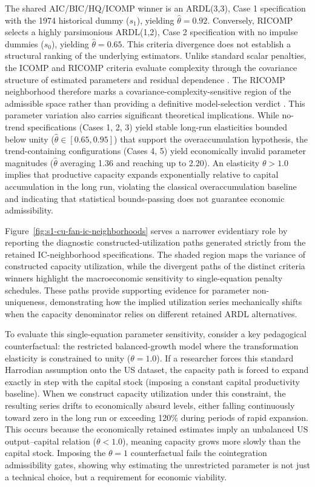 \documentclass[11pt]{article}
\begin{document}
The shared AIC/BIC/HQ/ICOMP winner is an ARDL(3,3), Case 1 specification with the 1974 historical dummy (\(s_1\)), yielding \(\hat{\theta}=0.92\). Conversely, RICOMP selects a highly parsimonious ARDL(1,2), Case 2 specification with no impulse dummies (\(s_0\)), yielding \(\hat{\theta}=0.65\). This criteria divergence does not establish a structural ranking of the underlying estimators. Unlike standard scalar penalties, the ICOMP and RICOMP criteria evaluate complexity through the covariance structure of estimated parameters and residual dependence \citep{Bozdogan1990,Bozdogan2000}. The RICOMP neighborhood therefore marks a covariance-complexity-sensitive region of the admissible space rather than providing a definitive model-selection verdict \citep{GuneyBozdoganArslan2021}. This parameter variation also carries significant theoretical implications. While no-trend specifications (Cases 1, 2, 3) yield stable long-run elasticities bounded below unity ($\hat{\theta} \in [0.65, 0.95]$) that support the overaccumulation hypothesis, the trend-containing configurations (Cases 4, 5) yield economically invalid parameter magnitudes ($\hat{\theta}$ averaging 1.36 and reaching up to 2.20). An elasticity $\theta > 1.0$ implies that productive capacity expands exponentially relative to capital accumulation in the long run, violating the classical overaccumulation baseline and indicating that statistical bounds-passing does not guarantee economic admissibility.

Figure~\ref{fig:s1-cu-fan-ic-neighborhoods} serves a narrower evidentiary role by reporting the diagnostic constructed-utilization paths generated strictly from the retained IC-neighborhood specifications. The shaded region maps the variance of constructed capacity utilization, while the divergent paths of the distinct criteria winners highlight the macroeconomic sensitivity to single-equation penalty schedules. These paths provide supporting evidence for parameter non-uniqueness, demonstrating how the implied utilization series mechanically shifts when the capacity denominator relies on different retained ARDL alternatives.

To evaluate this single-equation parameter sensitivity, consider a key pedagogical counterfactual: the restricted balanced-growth model where the transformation elasticity is constrained to unity ($\theta = 1.0$). If a researcher forces this standard Harrodian assumption onto the US dataset, the capacity path is forced to expand exactly in step with the capital stock (imposing a constant capital productivity baseline). When we construct capacity utilization under this constraint, the resulting series drifts to economically absurd levels, either falling continuously toward zero in the long run or exceeding 120\% during periods of rapid expansion. This occurs because the economically retained estimates imply an unbalanced US output--capital relation ($\theta < 1.0$), meaning capacity grows more slowly than the capital stock. Imposing the $\theta=1$ counterfactual fails the cointegration admissibility gates, showing why estimating the unrestricted parameter is not just a technical choice, but a requirement for economic viability.
\end{document}
